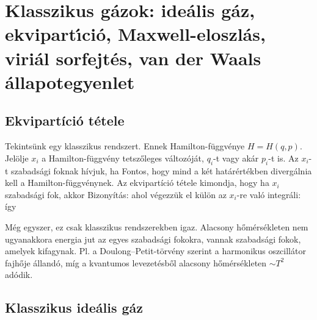 \chapter{Klasszikus g\'azok: ide\'alis g\'az, ekvipart\'{\i}ci\'o, Maxwell-eloszl\'as, viri\'al sorfejt\'es, van der Waals \'allapotegyenlet} 
 
 \section{Ekvipartíció tétele}
  
  Tekintsünk egy klasszikus rendszert.
   Ennek Hamilton-függvénye $H=H(q,p)$.
   Jelölje $x_i$ a Hamilton-függvény tetszőleges változóját, $q_i$-t vagy akár $p_i$-t is.
   Az $x_i$-t szabadsági foknak hívjuk, ha 
  Fontos, hogy mind a két határértékben divergálnia kell a Hamilton-függvénynek.
   Az ekvipartíció tétele kimondja, hogy ha $x_i$ szabadsági fok, akkor 
  Bizonyítás:
  ahol végezzük el külön az $x_i$-re való integráli:
  így
  
  Még egyszer, ez csak klasszikus rendszerekben igaz.
   Alacsony hőmérsékleten nem ugyanakkora energia jut az egyes szabadsági fokokra, vannak szabadsági fokok, amelyek kifagynak.
   Pl. a Doulong--Petit-törvény szerint a harmonikus oszcillátor fajhője állandó, míg a kvantumos levezetésből alacsony hőmérsékleten $\sim T^2$ adódik. 
  
 \section{Klasszikus ideális gáz}\label{ss:B06-CID}
  
